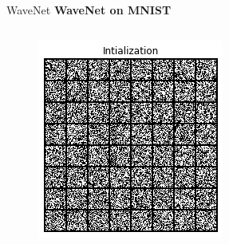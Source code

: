 \begin{frame}[allowframebreaks]{WaveNet}
    \textbf{\large WaveNet on MNIST}
    \vspace{2em}
    \begin{columns}
        \begin{column}{0.18\linewidth}
            \begin{figure}
                \centering
                \includegraphics[width=1\linewidth]{images/autoregressive/mnist/init.png}
            \end{figure}
        \end{column}
        \begin{column}{0.18\linewidth}
            \begin{figure}
                \centering

\end{figure}
\end{column}
\end{columns}
\end{frame}
